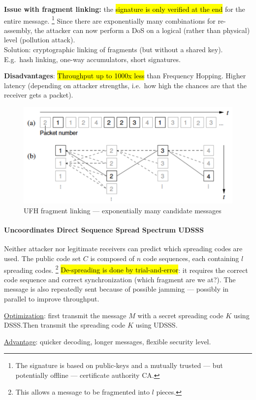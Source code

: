 \textbf{Issue with fragment linking:} the \hl{signature is only verified at the end} for the entire message.%
\footnote{The signature is based on public-keys and a mutually trusted --- but potentially offline --- certificate authority CA.}
Since there are exponentially many combinations for re-assembly, the attacker can now perform a DoS on a logical (rather than physical) level (pollution attack).
\\
Solution: cryptographic linking of fragments (but without a shared key).
E.g.\ hash linking, one-way accumulators, short signatures.

\textbf{Disadvantages}:
\hl{Throughput up to 1000x less} than Frequency Hopping.
Higher latency (depending on attacker strengths, i.e.\ how high the chances are that the receiver gets a packet).

\begin{figure}[h]
	\centering
	\includegraphics[scale=0.4]{images/3-ufh-fragment-linking.png}
	\caption{UFH fragment linking --- exponentially many candidate messages}%
	\label{fig:ufh-fragment-linking}
\end{figure}

\paragraph{Uncoordinates Direct Sequence Spread Spectrum UDSSS}
Neither attacker nor legitimate receivers can predict which spreading codes are used.
The public code set $C$ is composed of $n$ code sequences, each containing $l$ spreading codes.%
\footnote{This allows a message to be fragmented into $l$ pieces.}
\hl{De-spreading is done by trial-and-error}: it requires the correct code sequence and correct synchronization (which fragment are we at?).
The message is also repeatedly sent because of possible jamming --- possibly in parallel to improve throughput.

\underline{Optimization}: first transmit the message $M$ with a secret spreading code $K$ using DSSS.\@ Then transmit the spreading code $K$ using UDSSS.\@

\underline{Advantage}: quicker decoding, longer messages, flexible security level.


